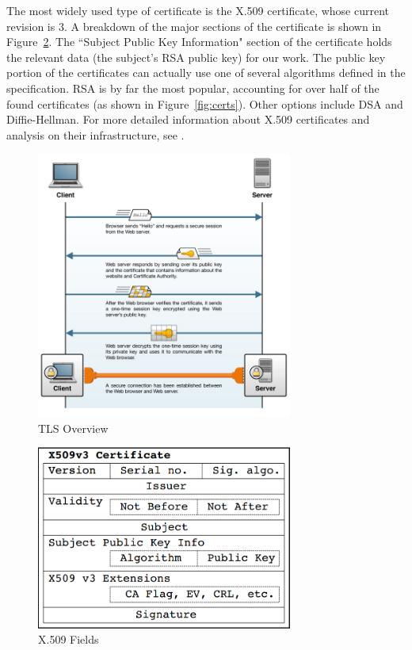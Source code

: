 \documentclass[smallextended]{svjour3}       %
\begin{document}
The most widely used type of certificate is the X.509 certificate, whose current
revision is 3. A breakdown of the major sections of the certificate is shown in
Figure~\ref{fig:x509}. The ``Subject Public Key Information" section of the
certificate holds the relevant data (the subject's RSA public key) for our work.
The public key portion of the certificates can actually use one of several
algorithms defined in the specification. RSA is by far the most popular,
accounting for over half of the found certificates (as shown in
Figure~\ref{fig:certs}). Other options include DSA and Diffie-Hellman. For more
detailed information about X.509 certificates and analysis on their
infrastructure, see \citet{holz2011ssl}.

\begin{figure}
   \centering
   \includegraphics[width=0.75\textwidth]{tls}
   \caption{TLS Overview \citep{tlsconcepts}\label{fig:tls}}
\end{figure}

\begin{figure}
   \centering
   \includegraphics[width=0.75\textwidth]{x509}
   \caption{X.509 Fields \citep{holz2011ssl}\label{fig:x509}}
\end{figure}
\end{document}
